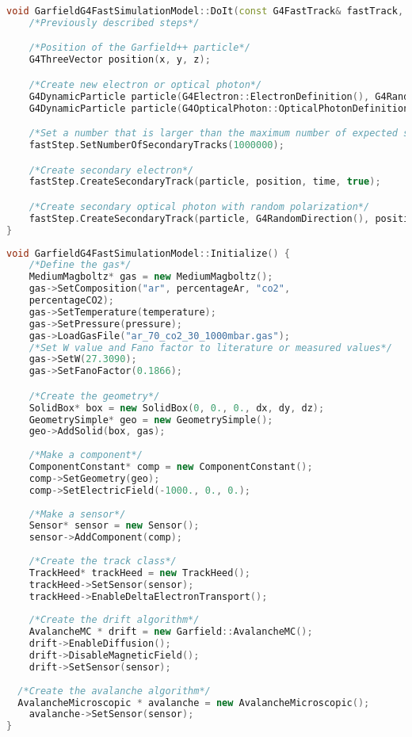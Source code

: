 \documentclass[preprint,12pt,sort&compress]{elsarticle}
\begin{document}
\newpage

\begin{lstlisting}[label=code_secondaries, caption=Production of secondary particles., language=C++]
void GarfieldG4FastSimulationModel::DoIt(const G4FastTrack& fastTrack, G4FastStep& fastStep) {	
    /*Previously described steps*/

    /*Position of the Garfield++ particle*/
    G4ThreeVector position(x, y, z);

    /*Create new electron or optical photon*/
    G4DynamicParticle particle(G4Electron::ElectronDefinition(), G4RandomDirection(), eKin);
    G4DynamicParticle particle(G4OpticalPhoton::OpticalPhotonDefinition(),G4RandomDirection(), eKin);

    /*Set a number that is larger than the maximum number of expected secondaries*/
    fastStep.SetNumberOfSecondaryTracks(1000000);

    /*Create secondary electron*/
    fastStep.CreateSecondaryTrack(particle, position, time, true);

    /*Create secondary optical photon with random polarization*/
    fastStep.CreateSecondaryTrack(particle, G4RandomDirection(), position, time, true);
}
\end{lstlisting}

\newpage

\begin{lstlisting}[label=code_garfield, caption=Setup of Garfield++ simulation., language=C++]
void GarfieldG4FastSimulationModel::Initialize() {
	/*Define the gas*/
	MediumMagboltz* gas = new MediumMagboltz();
	gas->SetComposition("ar", percentageAr, "co2",
	percentageCO2);
	gas->SetTemperature(temperature);
	gas->SetPressure(pressure);
	gas->LoadGasFile("ar_70_co2_30_1000mbar.gas");
	/*Set W value and Fano factor to literature or measured values*/
	gas->SetW(27.3090);
	gas->SetFanoFactor(0.1866);

	/*Create the geometry*/
	SolidBox* box = new SolidBox(0, 0., 0., dx, dy, dz);
	GeometrySimple* geo = new GeometrySimple();
	geo->AddSolid(box, gas);
	
	/*Make a component*/
	ComponentConstant* comp = new ComponentConstant();
	comp->SetGeometry(geo);
	comp->SetElectricField(-1000., 0., 0.);
	
	/*Make a sensor*/
	Sensor* sensor = new Sensor();
	sensor->AddComponent(comp);
	
	/*Create the track class*/
	TrackHeed* trackHeed = new TrackHeed();
	trackHeed->SetSensor(sensor);
	trackHeed->EnableDeltaElectronTransport();
	
	/*Create the drift algorithm*/
	AvalancheMC * drift = new Garfield::AvalancheMC();
	drift->EnableDiffusion();
	drift->DisableMagneticField();
	drift->SetSensor(sensor);
	
  /*Create the avalanche algorithm*/
  AvalancheMicroscopic * avalanche = new AvalancheMicroscopic();
	avalanche->SetSensor(sensor);
}
\end{lstlisting}
\end{document}
